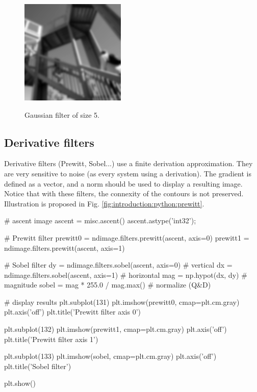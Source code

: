 \vspace*{-4pt}

\begin{figure}[H]
 \centering\caption{Gaussian filter of size 5.}%
 \includegraphics[width=5cm]{gaussian.png}%
 \label{fig:introduction:python:gaussian}%
\end{figure}

\vspace*{-7pt}
\subsection{Derivative filters}
Derivative filters (Prewitt, Sobel...) use a finite derivation approximation. They are very sensitive to noise (as every system using a derivation). The gradient is defined as a vector, and a norm should be used to display a resulting image. Notice that with these filters, the connexity of the contours is not preserved.
Illustration is proposed in Fig. \ref{fig:introduction:python:prewitt}.

\begin{python}
# ascent image
ascent = misc.ascent()
ascent.astype('int32');

# Prewitt filter
prewitt0 = ndimage.filters.prewitt(ascent, axis=0)
prewitt1 = ndimage.filters.prewitt(ascent, axis=1)

# Sobel filter
dy = ndimage.filters.sobel(ascent, axis=0) # vertical
dx = ndimage.filters.sobel(ascent, axis=1) # horizontal
mag = np.hypot(dx, dy)  # magnitude
sobel = mag * 255.0 / mag.max()  # normalize (Q&D)

# display results
plt.subplot(131)
plt.imshow(prewitt0, cmap=plt.cm.gray)
plt.axis('off')
plt.title('Prewitt filter axis 0')

plt.subplot(132)
plt.imshow(prewitt1, cmap=plt.cm.gray)
plt.axis('off')
plt.title('Prewitt filter axis 1')

plt.subplot(133)
plt.imshow(sobel, cmap=plt.cm.gray)
plt.axis('off')
plt.title('Sobel filter')

plt.show()
\end{python}

